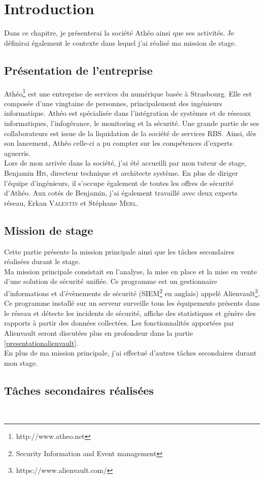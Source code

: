 \chapter{Introduction}
Dans ce chapitre, je présenterai la société Athéo ainsi que ses activités. Je définirai également le contexte dans lequel j'ai réalisé ma mission de stage. 

\section{Présentation de l'entreprise}
Athéo\footnote{http://www.atheo.net} est une entreprise de services du numérique basée à Strasbourg. Elle est composée d'une vingtaine de personnes, principalement des ingénieurs informatique. Athéo est spécialisée dans l'intégration de systèmes et de réseaux informatiques, l'infogérance, le monitoring et la sécurité. Une grande partie de ses collaborateurs est issue de la liquidation de la société de services RBS. Ainsi, dès son lancement, Athéo celle-ci a pu compter sur les compétences d'experts aguerris. \\

Lors de mon arrivée dans la société, j'ai été accueilli par mon tuteur de stage, Benjamin \textsc{His}, directeur technique et architecte système. En plus de diriger l'équipe d'ingénieurs, il s'occupe également de toutes les offres de sécurité d'Athéo. Aux cotés de Benjamin, j'ai également travaillé avec deux experts réseau, Erkan \textsc{Valentin} et Stéphane \textsc{Merl}. 

\section{Mission de stage}
Cette partie présente la mission principale ainsi que les tâches secondaires réalisées durant le stage. \\
Ma mission principale consistait en l'analyse, la mise en place et la mise en vente d'une solution de sécurité unifiée. Ce programme est un gestionnaire d'informations et d'évènements de sécurité (SIEM\footnote{Security Information and Event management} en anglais) appelé Alienvault\footnote{https://www.alienvault.com/}. Ce programme installé sur un serveur surveille tous les équipements présents dans le réseau et détecte les incidents de sécurité, affiche des statistiques et génère des rapports à partir des données collectées. Les fonctionnalités apportées par Alienvault seront discutées plus en profondeur dans la partie \ref{presentationalienvault}.\\
En plus de ma mission principale, j'ai effectué d'autres tâches secondaires durant mon stage. 

\section{Tâches secondaires réalisées}
\blindtext\\

